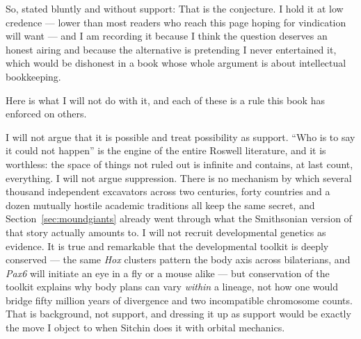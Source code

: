 So, stated bluntly and without support:  That is the conjecture. I hold it at low credence --- lower than most readers who
reach this page hoping for vindication will want --- and I am recording it because I think the
question deserves an honest airing and because the alternative is pretending I never entertained it,
which would be dishonest in a book whose whole argument is about intellectual bookkeeping.

Here is what I will not do with it, and each of these is a rule this book has enforced on others.

I will not argue that it is possible and treat possibility as support. ``Who is to say it could not
happen'' is the engine of the entire Roswell literature, and it is worthless: the space of things
not ruled out is infinite and contains, at last count, everything. I will not argue suppression.
There is no mechanism by which several thousand independent excavators across two centuries, forty
countries and a dozen mutually hostile academic traditions all keep the same secret, and
Section~\ref{sec:moundgiants} already went through what the Smithsonian version of that story
actually amounts to. I will not recruit developmental genetics as evidence. It is true and
remarkable that the developmental toolkit is deeply conserved --- the same \emph{Hox} clusters
pattern the body axis across bilaterians, and \emph{Pax6} will initiate an eye in a fly or a mouse
alike --- but conservation of the toolkit explains why body plans can vary \emph{within} a lineage,
not how one would bridge fifty million years of divergence and two incompatible chromosome counts.
That is background, not support, and dressing it up as support would be exactly the move I object to
when Sitchin does it with orbital mechanics.

